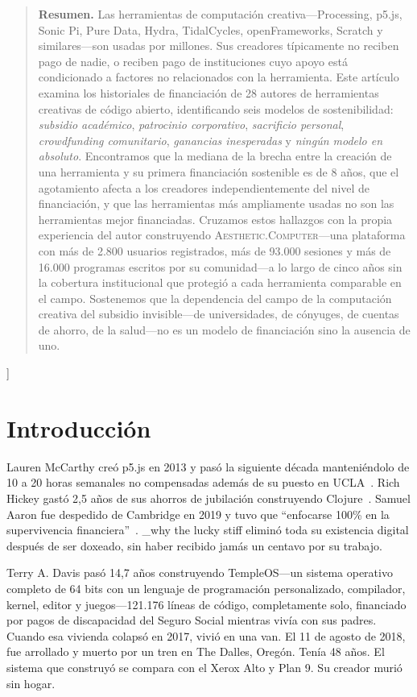 \documentclass[10pt,letterpaper,twocolumn]{article}
\newcommand{\ac}{\textsc{Aesthetic.Computer}}
\begin{document}
{\begin{quote}
\small\noindent\textbf{Resumen.}
Las herramientas de computación creativa---Processing, p5.js, Sonic Pi, Pure Data, Hydra, TidalCycles, openFrameworks, Scratch y similares---son usadas por millones. Sus creadores típicamente no reciben pago de nadie, o reciben pago de instituciones cuyo apoyo está condicionado a factores no relacionados con la herramienta. Este artículo examina los historiales de financiación de 28 autores de herramientas creativas de código abierto, identificando seis modelos de sostenibilidad: \emph{subsidio académico}, \emph{patrocinio corporativo}, \emph{sacrificio personal}, \emph{crowdfunding comunitario}, \emph{ganancias inesperadas} y \emph{ningún modelo en absoluto}. Encontramos que la mediana de la brecha entre la creación de una herramienta y su primera financiación sostenible es de 8 años, que el agotamiento afecta a los creadores independientemente del nivel de financiación, y que las herramientas más ampliamente usadas no son las herramientas mejor financiadas. Cruzamos estos hallazgos con la propia experiencia del autor construyendo \ac{}---una plataforma con más de 2.800 usuarios registrados, más de 93.000 sesiones y más de 16.000 programas escritos por su comunidad---a lo largo de cinco años sin la cobertura institucional que protegió a cada herramienta comparable en el campo. Sostenemos que la dependencia del campo de la computación creativa del subsidio invisible---de universidades, de cónyuges, de cuentas de ahorro, de la salud---no es un modelo de financiación sino la ausencia de uno.
\end{quote}
\vspace{0.5em}
}]

\section{Introducción}

Lauren McCarthy creó p5.js en 2013 y pasó la siguiente década manteniéndolo de 10 a 20 horas semanales no compensadas además de su puesto en UCLA~\citep{mccarthy2023making}. Rich Hickey gastó 2,5 años de sus ahorros de jubilación construyendo Clojure~\citep{hickey2020history}. Samuel Aaron fue despedido de Cambridge en 2019 y tuvo que ``enfocarse 100\% en la supervivencia financiera''~\citep{aaron2016sonic}. \_why the lucky stiff eliminó toda su existencia digital después de ser doxeado, sin haber recibido jamás un centavo por su trabajo.

Terry A. Davis pasó 14,7 años construyendo TempleOS---un sistema operativo completo de 64 bits con un lenguaje de programación personalizado, compilador, kernel, editor y juegos---121.176 líneas de código, completamente solo, financiado por pagos de discapacidad del Seguro Social mientras vivía con sus padres. Cuando esa vivienda colapsó en 2017, vivió en una van. El 11 de agosto de 2018, fue arrollado y muerto por un tren en The Dalles, Oregón. Tenía 48 años. El sistema que construyó se compara con el Xerox Alto y Plan 9. Su creador murió sin hogar.
\end{document}
